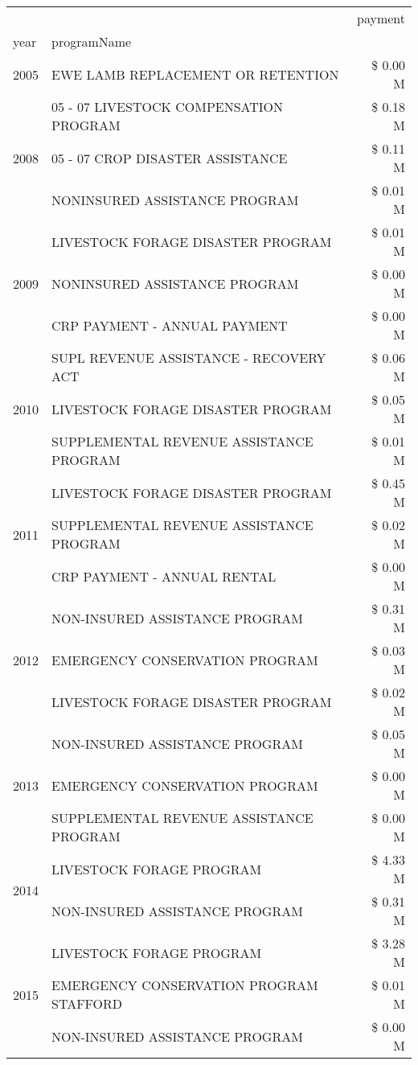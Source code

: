 \begin{tabular}{llr}
\toprule
 &  & payment \\
year & programName &  \\
\midrule
2005 & EWE LAMB REPLACEMENT OR RETENTION & \$ 0.00 M \\
\cline{1-3}
\multirow[t]{3}{*}{2008} & 05 - 07 LIVESTOCK COMPENSATION PROGRAM & \$ 0.18 M \\
 & 05 - 07 CROP DISASTER ASSISTANCE & \$ 0.11 M \\
 & NONINSURED ASSISTANCE PROGRAM & \$ 0.01 M \\
\cline{1-3}
\multirow[t]{3}{*}{2009} & LIVESTOCK FORAGE DISASTER  PROGRAM & \$ 0.01 M \\
 & NONINSURED ASSISTANCE PROGRAM & \$ 0.00 M \\
 & CRP PAYMENT - ANNUAL PAYMENT & \$ 0.00 M \\
\cline{1-3}
\multirow[t]{3}{*}{2010} & SUPL REVENUE ASSISTANCE - RECOVERY ACT & \$ 0.06 M \\
 & LIVESTOCK FORAGE DISASTER PROGRAM & \$ 0.05 M \\
 & SUPPLEMENTAL REVENUE ASSISTANCE PROGRAM & \$ 0.01 M \\
\cline{1-3}
\multirow[t]{3}{*}{2011} & LIVESTOCK FORAGE DISASTER PROGRAM & \$ 0.45 M \\
 & SUPPLEMENTAL REVENUE ASSISTANCE PROGRAM & \$ 0.02 M \\
 & CRP PAYMENT - ANNUAL RENTAL & \$ 0.00 M \\
\cline{1-3}
\multirow[t]{3}{*}{2012} & NON-INSURED ASSISTANCE PROGRAM & \$ 0.31 M \\
 & EMERGENCY CONSERVATION PROGRAM & \$ 0.03 M \\
 & LIVESTOCK FORAGE DISASTER PROGRAM & \$ 0.02 M \\
\cline{1-3}
\multirow[t]{3}{*}{2013} & NON-INSURED ASSISTANCE PROGRAM & \$ 0.05 M \\
 & EMERGENCY CONSERVATION PROGRAM & \$ 0.00 M \\
 & SUPPLEMENTAL REVENUE ASSISTANCE PROGRAM & \$ 0.00 M \\
\cline{1-3}
\multirow[t]{2}{*}{2014} & LIVESTOCK FORAGE PROGRAM & \$ 4.33 M \\
 & NON-INSURED ASSISTANCE PROGRAM & \$ 0.31 M \\
\cline{1-3}
\multirow[t]{3}{*}{2015} & LIVESTOCK FORAGE PROGRAM & \$ 3.28 M \\
 & EMERGENCY CONSERVATION PROGRAM STAFFORD & \$ 0.01 M \\
 & NON-INSURED ASSISTANCE PROGRAM & \$ 0.00 M \\

\end{tabular}
